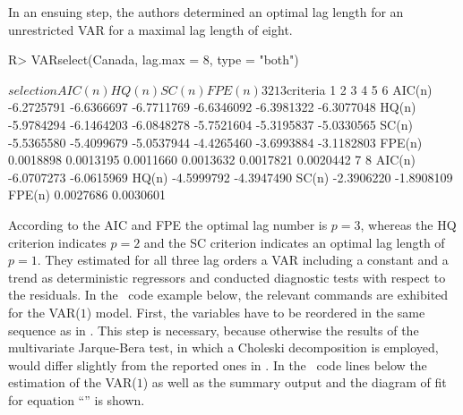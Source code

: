 \documentclass[nojss]{jss}
\begin{document}
In an ensuing step, the authors determined an optimal lag length for
an unrestricted VAR for a maximal lag length of eight. 
\begin{Schunk}
\begin{Sinput}
R> VARselect(Canada, lag.max = 8, type = "both")
\end{Sinput}
\begin{Soutput}
$selection
AIC(n)  HQ(n)  SC(n) FPE(n) 
     3      2      1      3 

$criteria
                1          2          3          4          5          6
AIC(n) -6.2725791 -6.6366697 -6.7711769 -6.6346092 -6.3981322 -6.3077048
HQ(n)  -5.9784294 -6.1464203 -6.0848278 -5.7521604 -5.3195837 -5.0330565
SC(n)  -5.5365580 -5.4099679 -5.0537944 -4.4265460 -3.6993884 -3.1182803
FPE(n)  0.0018898  0.0013195  0.0011660  0.0013632  0.0017821  0.0020442
                7          8
AIC(n) -6.0707273 -6.0615969
HQ(n)  -4.5999792 -4.3947490
SC(n)  -2.3906220 -1.8908109
FPE(n)  0.0027686  0.0030601
\end{Soutput}
\end{Schunk}
According to the AIC and FPE the optimal lag number is $p=3$,
whereas the HQ criterion indicates $p=2$ and the SC criterion
indicates an optimal lag length of $p=1$. They estimated for all
three lag orders a VAR including a constant and a trend as
deterministic regressors and conducted diagnostic tests with respect
to the residuals. In the ~code example below, the relevant
commands are exhibited for the VAR($1$) model. First, the variables
have to be reordered in the same sequence as in \citet{BRE2004}. This
step is necessary, because otherwise the results of the multivariate
Jarque-Bera test, in which a Choleski decomposition is employed, would
differ slightly from the reported ones in \citet{BRE2004}. In the
~code lines below the estimation of the VAR($1$) as well
as the summary output and the diagram of fit for equation ``'' is shown. 
\end{document}
